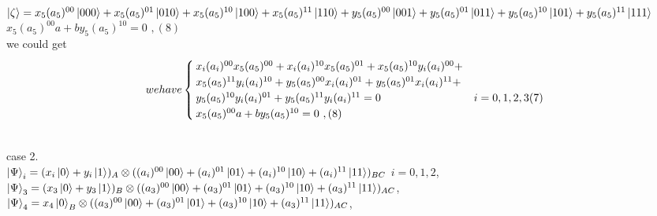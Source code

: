 \documentclass[a4paper,12pt]{article}
\begin{document}
 \newline \\
$\ket{\zeta}=x_{5}(a_{5})^{00}\ket{000}+x_{5}(a_{5})^{01}\ket{010}+x_{5}(a_{5})^{10}\ket{100}+x_{5}(a_{5})^{11}\ket{110}+y_{5}(a_{5})^{00}\ket{001}+y_{5}(a_{5})^{01}\ket{011}+y_{5}(a_{5})^{10}\ket{101}+y_{5}(a_{5})^{11}\ket{111}$
\newline \\
$x_{5}(a_{5})^{00}a+by_{5}(a_{5})^{10}=0$ $
,  (8)$
\newline \\
we could get 
\begin{equation}
we  have
\begin{cases}
x_{i}(a_{i})^{00}x_{5}(a_{5})^{00}+x_{i}(a_{i})^{10}x_{5}(a_{5})^{01}+x_{5}(a_{5})^{10}y_{i}(a_{i})^{00}+\\x_{5}(a_{5})^{11}y_{i}(a_{i})^{10}+y_{5}(a_{5})^{00}x_{i}(a_{i})^{01}+y_{5}(a_{5})^{01}x_{i}(a_{i})^{11}+\\y_{5}(a_{5})^{10}y_{i}(a_{i})^{01}+y_{5}(a_{5})^{11}y_{i}(a_{i})^{11}=0   & i=0,1,2,3  (7)  \\
x_{5}(a_{5})^{00}a+by_{5}(a_{5})^{10}=0$ $
,  (8)
\end{cases}
\end{equation}




\leavevmode
\newline \\





case 2.
\newline \\
$\ket{\Psi}_{i}=(x_{i}\ket{0}+y_{i}\ket{1})_{A}\otimes ((a_{i})^{00}\ket{00}+(a_{i})^{01}\ket{01}+(a_{i})^{10}\ket{10}+(a_{i})^{11}\ket{11})_{BC}     $  $ i=0,1,2$,
\newline \\
$\ket{\Psi}_{3}=(x_{3}\ket{0}+y_{3}\ket{1})_{B}\otimes((a_{3})^{00}\ket{00}+(a_{3})^{01}\ket{01}+(a_{3})^{10}\ket{10}+(a_{3})^{11}\ket{11})_{AC}$,
\newline \\
$\ket{\Psi}_{4}=x_{4}\ket{0}_{B}\otimes((a_{3})^{00}\ket{00}+(a_{3})^{01}\ket{01}+(a_{3})^{10}\ket{10}+(a_{3})^{11}\ket{11})_{AC}$,
\end{document}
